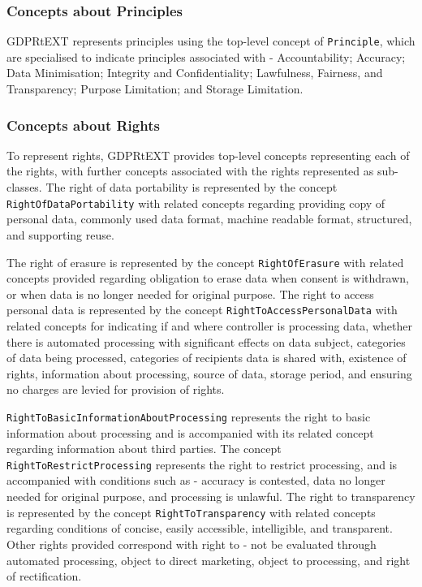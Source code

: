 \subsubsection{Concepts about Principles}
GDPRtEXT represents principles using the top-level concept of \texttt{Principle}, which are specialised to indicate principles associated with - Accountability; Accuracy; Data Minimisation; Integrity and Confidentiality; Lawfulness, Fairness, and Transparency; Purpose Limitation; and Storage Limitation.

\subsubsection{Concepts about Rights}
To represent rights, GDPRtEXT provides top-level concepts representing each of the rights, with further concepts associated with the rights represented as sub-classes. The right of data portability is represented by the concept \texttt{RightOfDataPortability} with related concepts regarding providing copy of personal data, commonly used data format, machine readable format, structured, and supporting reuse.

The right of erasure is represented by the concept \texttt{RightOfErasure} with related concepts provided regarding obligation to erase data when consent is withdrawn, or when data is no longer needed for original purpose. The right to access personal data is represented by the concept \texttt{RightToAccessPersonalData} with related concepts for indicating if and where controller is processing data, whether there is automated processing with significant effects on data subject, categories of data being processed, categories of recipients data is shared with, existence of rights, information about processing, source of data, storage period, and ensuring no charges are levied for provision of rights.

\texttt{RightToBasicInformationAboutProcessing} represents the right to basic information about processing and is accompanied with its related concept regarding information about third parties. The concept \texttt{RightToRestrictProcessing} represents the right to restrict processing, and is accompanied with conditions such as - accuracy is contested, data no longer needed for original purpose, and processing is unlawful. The right to transparency is represented by the concept \texttt{RightToTransparency} with related concepts regarding conditions of concise, easily accessible, intelligible, and transparent. Other rights provided correspond with right to - not be evaluated through automated processing, object to direct marketing,  object to processing, and right of rectification.


